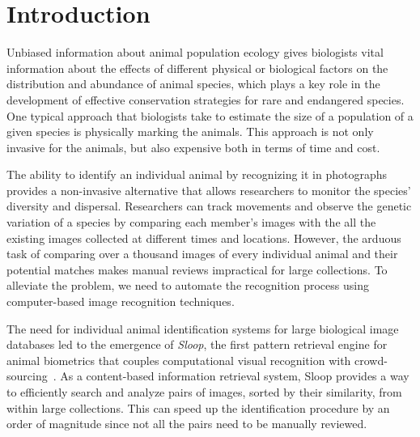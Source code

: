 
\chapter{Introduction}

Unbiased information about animal population ecology gives biologists vital
information about the effects of different physical or biological factors on
the distribution and abundance of animal species, which plays a key role in the
development of effective conservation strategies for rare and endangered
species. One typical approach that biologists take to estimate the size of a
population of a given species is physically marking the animals.  This approach
is not only invasive for the animals, but also expensive both in terms of time
and cost.

The ability to identify an individual animal by recognizing it in photographs
provides a non-invasive alternative that allows researchers to monitor the
species' diversity and dispersal.  Researchers can track movements and observe
the genetic variation of a species by comparing each member's images with the
all the existing images collected at different times and locations. However,
the arduous task of comparing over a thousand images of every individual animal
and their potential matches makes manual reviews impractical for large
collections. To alleviate the problem, we need to automate the recognition
process using computer-based image recognition techniques.

The need for individual animal identification systems for large biological
image databases led to the emergence of \emph{Sloop}, the first pattern
retrieval engine for animal biometrics that couples computational visual
recognition with crowd-sourcing~\cite{sloop13,sloop14,sloop15}. As a
content-based information retrieval system, Sloop provides a way to efficiently
search and analyze pairs of images, sorted by their similarity, from within
large collections. This can speed up the identification procedure by an order
of magnitude since not all the pairs need to be manually reviewed.


